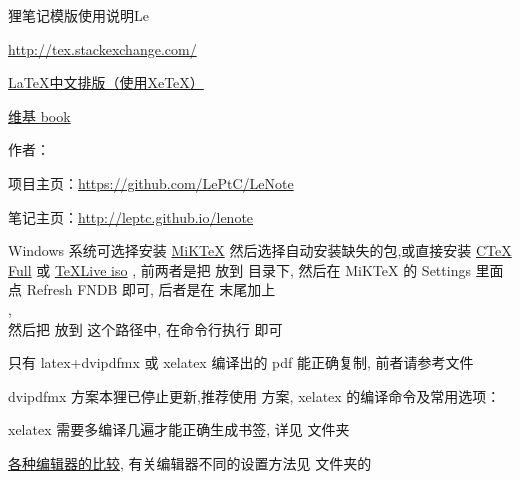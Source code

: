 \documentclass{leptc}
\begin{document}
\begin{lecover}{狸笔记}{模版使用说明}{Le}




\url{http://tex.stackexchange.com/ }

\href{http://linux-wiki.cn/wiki/zh-hans/LaTeX%E4%B8%AD%E6%96%87%E6%8E%92%E7%89%88%EF%BC%88%E4%BD%BF%E7%94%A8XeTeX%EF%BC%89 }{ LaTeX中文排版（使用XeTeX）}

\href{http://www.wikibooks.org }{维基 book}

\end{lecover}



作者：\href{mailto:alileptc@gmail.com}{\LePtC} 

项目主页：\url{https://github.com/LePtC/LeNote }

笔记主页：\url{http://leptc.github.io/lenote }




Windows 系统可选择安装
\href{http://miktex.org/download}{MiKTeX}
然后选择自动安装缺失的包,或直接安装
\href{http://www.ctex.org/CTeXDownload }{CTeX Full}
或 \href{http://www.ctan.org/tex-archive/systems/texlive/Images/ }{TeXLive iso} ,
前两者是把  放到
 目录下,
然后在 MiKTeX 的 Settings 里面点 Refresh FNDB 即可,
后者是在  末尾加上
\\ ,
\\然后把 放到
 这个路径中,
在命令行执行  即可

只有 latex+dvipdfmx 或 xelatex 编译出的 pdf 能正确复制,
前者请参考文件 

dvipdfmx 方案本狸已停止更新,推荐使用 \XeTeX 方案,
xelatex 的编译命令及常用选项：


xelatex 需要多编译几遍才能正确生成书签,
详见  文件夹


\href{http://tex.stackexchange.com/questions/339/latex-editors-ides }{各种编辑器的比较},
有关编辑器不同的设置方法见  文件夹的 
\end{document}
